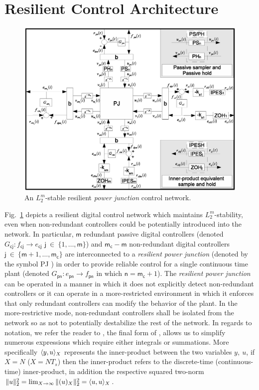 \section{Resilient Control Architecture}
\label{S:control}%
\begin{figure}
  \centering
  \includegraphics[width=6.0in]{figures/reselient_control_network}
  \caption{An $L^m_2$-stable resilient {\em power junction} control network.}
  \label{fig:resilient_control_net}
\end{figure}
Fig.~\ref{fig:resilient_control_net} depicts a resilient digital
control network which maintains $L^m_2$-stability, even when
non-redundant controllers could be potentially introduced into the
network.  In particular, $\mathsf{m}$ redundant passive digital
controllers (denoted $G_{\mathsf{cj}}:f_{\mathsf{cj}} \rightarrow
e_{\mathsf{cj}}$ $\mathsf{j}\ \in\ \{1,\dots,\mathsf{m}\}$) and
$\mathsf{m_c} - \mathsf{m}$ non-redundant digital controllers
$\mathsf{j}\ \in\ \{\mathsf{m}+1,\dots,\mathsf{m_c}\}$ are
interconnected to a {\em resilient power  junction} (denoted by the
symbol \textsf{PJ} ) in order to
provide reliable control for a single continuous time 
plant (denoted $G_{\mathsf{pn}}: e_{\mathsf{pn}} \rightarrow
f_{\mathsf{pn}}$ in which $\mathsf{n}=\mathsf{m_c}+1$).  The {\em
  resilient power junction} can be operated in a manner in which it
does not explicitly detect non-redundant controllers or it can
operate in a more-restricted environment in which it enforces that
only redundant controllers can modify the behavior of the plant.
In the more-restrictive mode, non-redundant controllers shall be
isolated from the network so as not to potentially destabilize the
rest of the network.  In regards to notation, we refer the reader to
, the final form of , allows us to
simplify numerous expressions which require either integrals or
summations.  More specifically $\langle y,u \rangle_X$ represents the
inner-product between the two variables $y,\ u$, if $X=N$ ($X=NT_s$) then the
inner-product refers to the discrete-time (continuous-time)
inner-product, in addition the respective squared two-norm
$\|u\|_{2}^2=\lim_{X \rightarrow \infty}\|(u)_X\|_{2}^2=\langle u,u \rangle_X$.
